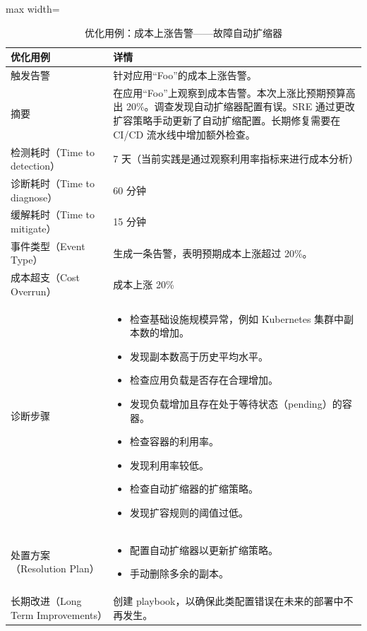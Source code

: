 \documentclass[10pt,UTF8,fontset=fandol]{ctexart}
\begin{document}
\begin{table}[H]
\centering
\caption{优化用例：成本上涨告警——故障自动扩缩器}
\label{tab:e26}
\begin{adjustbox}{max width=\linewidth}
\begin{tabular}{@{}p{3.2cm}p{11cm}@{}}
\toprule
\textbf{优化用例} & \textbf{详情} \\
\midrule
触发告警 & 针对应用“Foo”的成本上涨告警。 \\
\addlinespace
摘要 & 在应用“Foo”上观察到成本告警。本次上涨比预期预算高出 20\%。调查发现自动扩缩器配置有误。SRE 通过更改扩容策略手动更新了自动扩缩配置。长期修复需要在 CI/CD 流水线中增加额外检查。 \\
\addlinespace
检测耗时（Time to detection） & 7 天（当前实践是通过观察利用率指标来进行成本分析） \\
诊断耗时（Time to diagnose） & 60 分钟 \\
缓解耗时（Time to mitigate） & 15 分钟 \\
事件类型（Event Type） & 生成一条告警，表明预期成本上涨超过 20\%。 \\
成本超支（Cost Overrun） & 成本上涨 20\% \\
\addlinespace
诊断步骤 &
\begin{itemize}[leftmargin=*,nosep]
\item 检查基础设施规模异常，例如 Kubernetes 集群中副本数的增加。
\item 发现副本数高于历史平均水平。
\item 检查应用负载是否存在合理增加。
\item 发现负载增加且存在处于等待状态（pending）的容器。
\item 检查容器的利用率。
\item 发现利用率较低。
\item 检查自动扩缩器的扩缩策略。
\item 发现扩容规则的阈值过低。
\end{itemize} \\
\addlinespace
处置方案（Resolution Plan） &
\begin{itemize}[leftmargin=*,nosep]
\item 配置自动扩缩器以更新扩缩策略。
\item 手动删除多余的副本。
\end{itemize} \\
\addlinespace
长期改进（Long Term Improvements） & 创建 playbook，以确保此类配置错误在未来的部署中不再发生。 \\
\bottomrule
\end{tabular}
\end{adjustbox}
\end{table}
\end{document}
